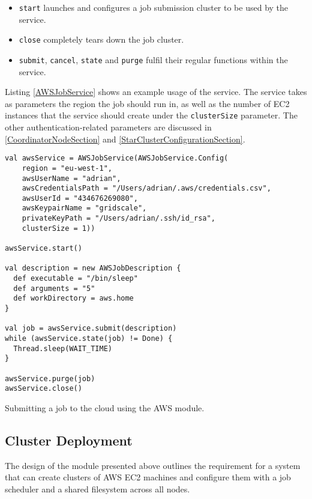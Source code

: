 \begin{itemize}
	\item \verb|start| launches and configures a job submission cluster to be used by the service.
	\item \verb|close| completely tears down the job cluster.
	\item \verb|submit|, \verb|cancel|, \verb|state| and \verb|purge| fulfil their regular functions within the service.
\end{itemize}

Listing \ref{AWSJobService} shows an example usage of the service. The service takes as parameters the region the job should run in, as well as the number of EC2 instances that the service should create under the \verb|clusterSize| parameter. The other authentication-related parameters are discussed in \ref{CoordinatorNodeSection} and \ref{StarClusterConfigurationSection}.

\begin{listing}[h]
	\centering
	\begin{minipage}{11.8cm}
		\begin{verbatim}
val awsService = AWSJobService(AWSJobService.Config(
    region = "eu-west-1",
    awsUserName = "adrian",
    awsCredentialsPath = "/Users/adrian/.aws/credentials.csv",
    awsUserId = "434676269080",
    awsKeypairName = "gridscale",
    privateKeyPath = "/Users/adrian/.ssh/id_rsa",
    clusterSize = 1))

awsService.start()

val description = new AWSJobDescription {
  def executable = "/bin/sleep"
  def arguments = "5"
  def workDirectory = aws.home
}

val job = awsService.submit(description)
while (awsService.state(job) != Done) {
  Thread.sleep(WAIT_TIME)
}

awsService.purge(job)
awsService.close()
		\end{verbatim}
	\end{minipage}
	\caption{Submitting a job to the cloud using the AWS module.}
	\label{AWSJobService}
\end{listing}

\vspace{-5mm}
\subsection{Cluster Deployment}

The design of the module presented above outlines the requirement for a system that can create clusters of AWS EC2 machines and configure them with a job scheduler and a shared filesystem across all nodes.


